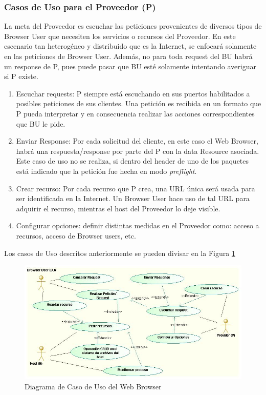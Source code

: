		\subsubsection{Casos de Uso para el Proveedor (P)}
		La meta del Proveedor es escuchar las peticiones provenientes de diversos tipos de Browser User que necesiten los servicios o recursos del Proveedor. En este escenario tan heterogéneo y distribuido que es la Internet, se enfocará solamente en las peticiones de Browser User. Además, no para toda request del BU habrá un response de P, pues puede pasar que BU esté solamente intentando averiguar si P existe.
			\begin{enumerate}
				\item Escuchar requests: P siempre está escuchando en sus puertos habilitados a posibles peticiones de sus clientes. Una petición es recibida en un formato que P pueda interpretar y en consecuencia realizar las acciones correspondientes que BU le pide. 
				\item Enviar Response: Por cada solicitud del cliente, en este caso el Web Browser, habrá una respuesta/response por parte del P con la data Resource asociada. Este caso de uso no se realiza, si dentro del header de uno de los paquetes está indicado que la petición fue hecha en modo \textit{preflight}.
				\item Crear recurso: Por cada recurso que P crea, una URL única será usada para ser identificada en la Internet. Un Browser User hace uso de tal URL para adquirir el recurso, mientras el host del Proveedor lo deje visible.
				\item Configurar opciones: definir distintas medidas en el Proveedor como: acceso a recursos, acceso de Browser users, etc.
			\end{enumerate}

		Los casos de Uso descritos anteriormente se pueden divisar en la Figura \ref{fig:CUBrowser}

	    \begin{figure}[h]
	        \centering
	        \includegraphics[scale=0.45]{figures/chap4/UCBrowser.jpg}
	        \caption{Diagrama de Caso de Uso del Web Browser}
	        \label{fig:CUBrowser}
	    \end{figure}


